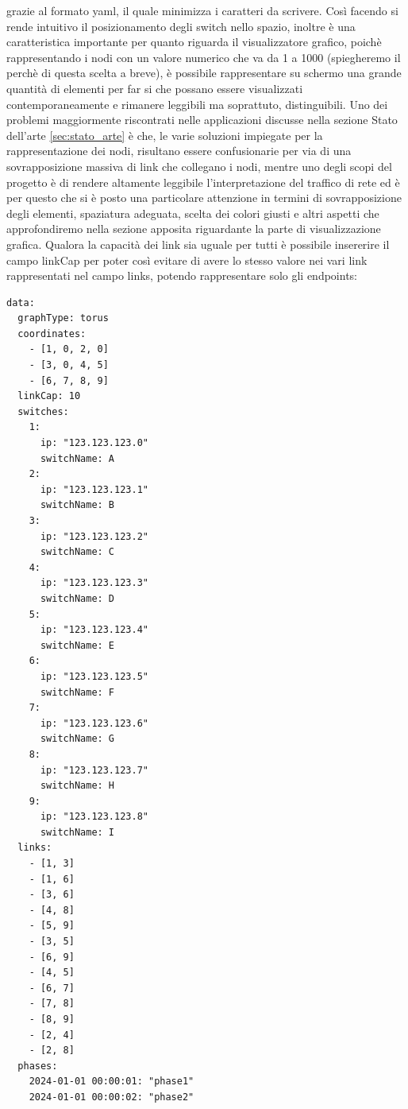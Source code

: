 \documentclass[binding=0.6cm]{sapthesis}
\begin{document}
grazie al formato yaml, il quale minimizza i caratteri da scrivere.
Così facendo si rende intuitivo il posizionamento degli switch nello spazio, inoltre è una caratteristica importante per quanto riguarda il
visualizzatore grafico, poichè rappresentando i nodi con un valore numerico che va da 1 a 1000 (spiegheremo il perchè di questa scelta a breve), è 
possibile rappresentare su schermo una grande quantità di elementi per far si che possano essere visualizzati contemporaneamente e rimanere leggibili ma soprattuto,
 distinguibili. Uno dei problemi maggiormente riscontrati nelle applicazioni discusse nella sezione Stato dell'arte \ref{sec:stato_arte} è che, le varie soluzioni impiegate
 per la rappresentazione dei nodi, risultano essere confusionarie per via di una sovrapposizione massiva di link che collegano i nodi, mentre uno degli scopi del
 progetto è di rendere altamente leggibile l'interpretazione del traffico di rete ed è per questo che si è posto una particolare attenzione in termini di
 sovrapposizione degli elementi, spaziatura adeguata, scelta dei colori giusti e altri aspetti che approfondiremo nella sezione apposita riguardante la parte
 di visualizzazione grafica.
Qualora la capacità dei link sia uguale per tutti è possibile insererire il campo 
linkCap per poter così evitare di avere lo stesso valore nei vari link rappresentati nel campo links, potendo rappresentare solo gli endpoints:

{\scriptsize %
\begin{lstlisting}[caption={esempio di custom file con capacità uguali a tutti i link}, label={fig:custom_graph_example}]
data:
  graphType: torus
  coordinates:
    - [1, 0, 2, 0]
    - [3, 0, 4, 5]
    - [6, 7, 8, 9]
  linkCap: 10
  switches:
    1:
      ip: "123.123.123.0"
      switchName: A
    2:
      ip: "123.123.123.1"
      switchName: B
    3:
      ip: "123.123.123.2"
      switchName: C
    4:
      ip: "123.123.123.3"
      switchName: D
    5:
      ip: "123.123.123.4"
      switchName: E
    6:
      ip: "123.123.123.5"
      switchName: F
    7:
      ip: "123.123.123.6"
      switchName: G
    8:
      ip: "123.123.123.7"
      switchName: H
    9:
      ip: "123.123.123.8"
      switchName: I
  links:
    - [1, 3]
    - [1, 6]
    - [3, 6]
    - [4, 8]
    - [5, 9]
    - [3, 5]
    - [6, 9]
    - [4, 5]
    - [6, 7]
    - [7, 8]
    - [8, 9]
    - [2, 4]
    - [2, 8]
  phases:
    2024-01-01 00:00:01: "phase1"
    2024-01-01 00:00:02: "phase2"
\end{lstlisting}
}
\end{document}
